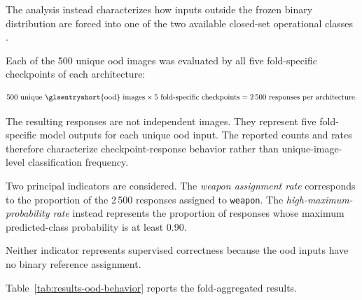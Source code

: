 The analysis instead characterizes how inputs outside the frozen binary
distribution are forced into one of the two available closed-set operational
classes
\cite{hendrycks2017baseline,liang2018odin,fort2021exploring}.

Each of the 500 unique \gls{ood} images was evaluated by all five
fold-specific checkpoints of each architecture:

\begin{equation}
500\ \text{unique \glsentryshort{ood} images}
\times
5\ \text{fold-specific checkpoints}
=
2\,500\ \text{responses per architecture}.
\end{equation}

The resulting responses are not independent images. They represent five
fold-specific model outputs for each unique \gls{ood} input. The reported
counts and rates therefore characterize checkpoint-response behavior rather
than unique-image-level classification frequency.

Two principal indicators are considered. The \emph{weapon assignment rate}
corresponds to the proportion of the 2\,500 responses assigned to
\texttt{weapon}. The \emph{high-maximum-probability rate} instead represents
the proportion of responses whose maximum predicted-class probability is at
least 0.90.

Neither indicator represents supervised correctness because the \gls{ood}
inputs have no binary reference assignment.

Table~\ref{tab:results-ood-behavior} reports the fold-aggregated results.


